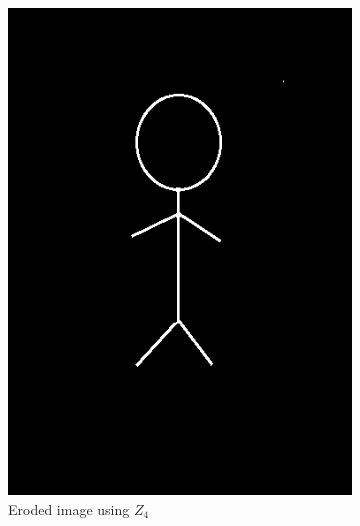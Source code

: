 \documentclass[a4paper]{article}
\begin{document}
\begin{figure}[htp]
\begin{subfigure}{.33\textwidth}
  \includegraphics[width=.9\linewidth]{ex2-erosion-z4.png}
  \caption{Eroded image using $Z_4$}
  \label{fig:sub2}
\end{subfigure}
\begin{subfigure}{.33\textwidth}
  \centering

\end{subfigure}
\end{figure}
\end{document}

